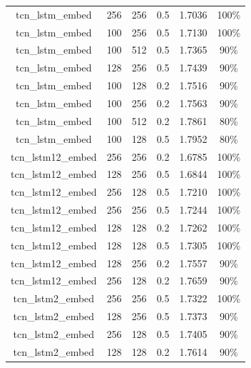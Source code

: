\documentclass[12pt]{article}
\begin{document}
\begin{longtable}[c]{@{}>{\ttfamily}cccccc@{}}
	tcn\_lstm\_embed     & 256            & 256         & 0.5          & 1.7036   & 100\% \\
	tcn\_lstm\_embed     & 100            & 256         & 0.5          & 1.7130   & 100\% \\
	tcn\_lstm\_embed     & 100            & 512         & 0.5          & 1.7365   & 90\%  \\
	tcn\_lstm\_embed     & 128            & 256         & 0.5          & 1.7439   & 90\%  \\
	tcn\_lstm\_embed     & 100            & 128         & 0.2          & 1.7516   & 90\%  \\
	tcn\_lstm\_embed     & 100            & 256         & 0.2          & 1.7563   & 90\%  \\
	tcn\_lstm\_embed     & 100            & 512         & 0.2          & 1.7861   & 80\%  \\
	tcn\_lstm\_embed     & 100            & 128         & 0.5          & 1.7952   & 80\%  \\\midrule
	tcn\_lstm12\_embed   & 256            & 256         & 0.2          & 1.6785   & 100\% \\
	tcn\_lstm12\_embed   & 128            & 256         & 0.5          & 1.6844   & 100\% \\
	tcn\_lstm12\_embed   & 256            & 128         & 0.5          & 1.7210   & 100\% \\
	tcn\_lstm12\_embed   & 256            & 256         & 0.5          & 1.7244   & 100\% \\
	tcn\_lstm12\_embed   & 128            & 128         & 0.2          & 1.7262   & 100\% \\
	tcn\_lstm12\_embed   & 128            & 128         & 0.5          & 1.7305   & 100\% \\
	tcn\_lstm12\_embed   & 128            & 256         & 0.2          & 1.7557   & 90\%  \\
	tcn\_lstm12\_embed   & 256            & 128         & 0.2          & 1.7659   & 90\%  \\\midrule
	tcn\_lstm2\_embed    & 256            & 256         & 0.5          & 1.7322   & 100\% \\
	tcn\_lstm2\_embed    & 128            & 256         & 0.5          & 1.7373   & 90\%  \\
	tcn\_lstm2\_embed    & 256            & 128         & 0.5          & 1.7405   & 90\%  \\
	tcn\_lstm2\_embed    & 128            & 128         & 0.2          & 1.7614   & 90\%  \\

\end{longtable}
\end{document}
